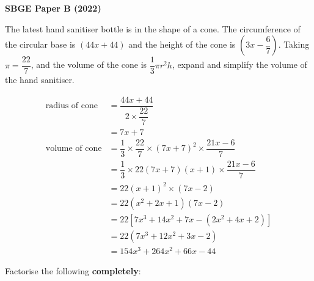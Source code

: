 \documentclass[11pt, answers, addpoints]{exam}
\renewcommand{\frac}[2]{\dfrac{#1}{#2}}
\begin{document}
\onehalfspacing%

\begin{center}
	\Large
	\textbf{SBGE Paper B (2022)}
\end{center}

\bracketedpoints%
\pointsinrightmargin%

\begin{questions}
	\question[3]
	The latest hand sanitiser bottle is in the shape of a cone.
	The circumference of the circular base is \((44x + 44)\) and
	the height of the cone is \(\left(3x - \frac{6}{7}\right)\). Taking
	\(\pi = \frac{22}{7}\), and the volume of the cone is
	\(\frac{1}{3}\pi r^{2}h\), expand and simplify the volume of the hand
	sanitiser.

	\begin{solution}
		\begin{align*}
			\text{radius of cone} & = \frac{44x + 44}{2 \times \frac{22}{7}}                                     \\
			                      & = 7x + 7                                                                     \\
			\text{volume of cone} & = \frac{1}{3} \times \frac{22}{7} \times (7x + 7)^2 \times \frac{21x - 6}{7} \\
			                      & = \frac{1}{3} \times 22(7x + 7)(x + 1) \times \frac{21x - 6}{7}              \\
			                      & = 22(x + 1)^2 \times (7x - 2)                                                \\
			                      & = 22\left(x^2 + 2x + 1\right)(7x - 2)                                        \\
			                      & = 22\left[7x^3 + 14x^2 + 7x - \left(2x^2 + 4x + 2\right)\right]              \\
			                      & = 22\left(7x^3 + 12x^2 + 3x - 2\right)                                       \\
			                      & = 154x^3 + 264x^2 + 66x - 44
		\end{align*}
	\end{solution}

	\question Factorise the following \textbf{completely}:
\end{questions}
\end{document}

